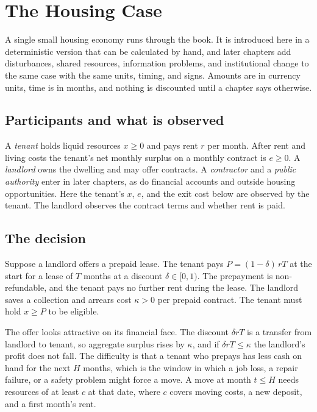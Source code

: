 \chapter*{The Housing Case}

A single small housing economy runs through the book. It is introduced here in a deterministic version that can be calculated by hand, and later chapters add disturbances, shared resources, information problems, and institutional change to the same case with the same units, timing, and signs. Amounts are in currency units, time is in months, and nothing is discounted until a chapter says otherwise.

\section*{Participants and what is observed}

A \emph{tenant} holds liquid resources $x\ge 0$ and pays rent $r$ per month. After rent and living costs the tenant's net monthly surplus on a monthly contract is $e\ge 0$. A \emph{landlord} owns the dwelling and may offer contracts. A \emph{contractor} and a \emph{public authority} enter in later chapters, as do financial accounts and outside housing opportunities. Here the tenant's $x$, $e$, and the exit cost below are observed by the tenant. The landlord observes the contract terms and whether rent is paid.

\section*{The decision}

Suppose a landlord offers a prepaid lease. The tenant pays $P=(1-\delta)\,rT$ at the start for a lease of $T$ months at a discount $\delta\in[0,1)$. The prepayment is non-refundable, and the tenant pays no further rent during the lease. The landlord saves a collection and arrears cost $\kappa>0$ per prepaid contract. The tenant must hold $x\ge P$ to be eligible.

The offer looks attractive on its financial face. The discount $\delta rT$ is a transfer from landlord to tenant, so aggregate surplus rises by $\kappa$, and if $\delta rT\le\kappa$ the landlord's profit does not fall. The difficulty is that a tenant who prepays has less cash on hand for the next $H$ months, which is the window in which a job loss, a repair failure, or a safety problem might force a move. A move at month $t\le H$ needs resources of at least $c$ at that date, where $c$ covers moving costs, a new deposit, and a first month's rent.

